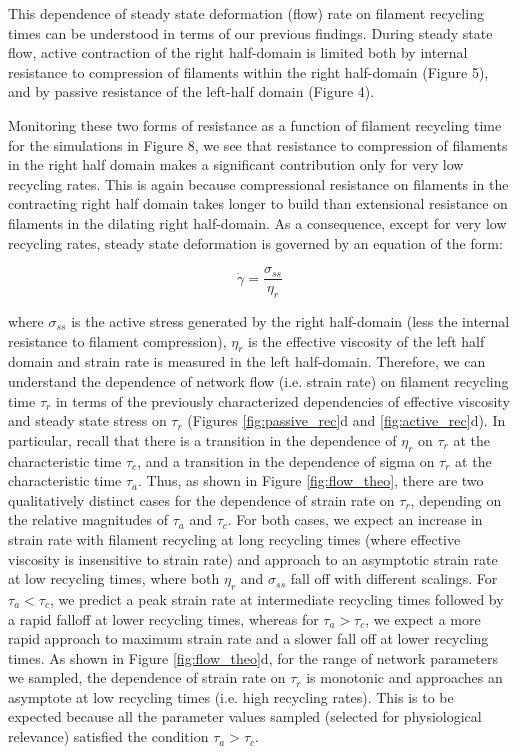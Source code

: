 \documentclass[10pt,letterpaper]{article}
\begin{document}
This dependence of steady state deformation (flow) rate on filament recycling times can be understood in terms of our previous findings.  During steady state flow, active contraction of the right half-domain is limited both by internal resistance to compression of filaments within the right half-domain (Figure 5), and by passive resistance of the left-half domain (Figure 4).  

Monitoring these two forms of resistance as a function of filament recycling time for the simulations in Figure 8, we see that resistance to compression of filaments in the right half domain makes a significant contribution only for very low recycling rates.  This is again because compressional resistance on filaments in the contracting right half domain takes longer to build than extensional resistance on filaments in the dilating right half-domain. As a consequence, except for very low recycling rates,  steady state deformation is governed by an equation of the form:

\begin{equation}
\label{eqn:simple_sigma}
\dot{\gamma} = \frac{\sigma_{ss}}{\eta_r}  
\end{equation}

where $\sigma_{ss}$ is the active stress generated by the right half-domain (less the internal resistance to filament compression), $\eta_r$ is the effective viscosity of the left half domain and strain rate is measured in the left half-domain.  Therefore, we can understand the dependence of network flow (i.e. strain rate) on filament recycling time $\tau_r$ in terms of the previously characterized dependencies of effective viscosity and steady state stress on $\tau_r$ (Figures \ref{fig:passive_rec}d and \ref{fig:active_rec}d). In particular, recall that there is a transition in the dependence of $\eta_r$ on $\tau_r$ at the characteristic time $\tau_c$, and a transition in the dependence of sigma on $\tau_r$ at the characteristic time $\tau_a$.  Thus, as shown in Figure \ref{fig:flow_theo},  there are two qualitatively distinct cases for the dependence of strain rate on $\tau_r$, depending on the relative magnitudes of $\tau_a$ and $\tau_c$.  For both cases, we expect an increase in strain rate with filament recycling at long recycling times (where effective viscosity is insensitive to strain rate)  and approach to an asymptotic strain rate at low recycling times, where both $\eta_r$ and $\sigma_{ss}$ fall off with different scalings. For $\tau_a < \tau_c$, we predict a peak strain rate at intermediate recycling times followed by a rapid falloff at lower recycling times, whereas for $\tau_a > \tau_c$, we expect a more rapid approach to maximum strain rate and a slower fall off at lower recycling times.  As shown in Figure \ref{fig:flow_theo}d, for the range of network parameters we sampled, the dependence of strain rate on $\tau_r$ is monotonic and approaches an asymptote at low recycling times (i.e. high recycling rates).  This is to be expected because all the parameter values sampled (selected for physiological relevance) satisfied the condition $\tau_a > \tau_c$.
\end{document}

